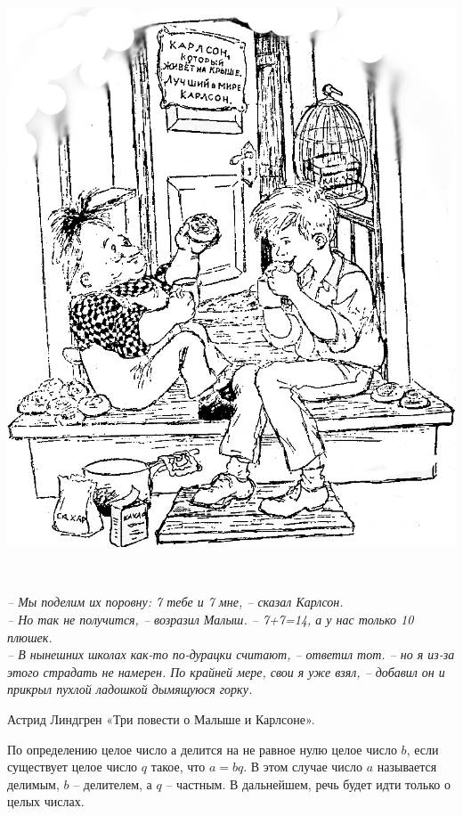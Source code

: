 
\begin{floatingfigure}[l]{0\textwidth}
	
	\includegraphics[scale=0.17]{./img/karlson}
\end{floatingfigure}~

\epigraph{
\textit{– Мы поделим их поровну: 7 тебе и 7 мне, – сказал Карлсон.\\
– Но так не получится, – возразил Малыш. –  7+7=14, а у нас только 10 плюшек.\\
– В нынешних школах как-то по-дурацки считают, – ответил тот. – но я из-за этого страдать не намерен. По крайней мере, свои я уже взял, – добавил он и прикрыл пухлой ладошкой дымящуюся горку.
}}{Астрид Линдгрен «Три повести о Малыше и Карлсоне».}


По определению целое число $а$ делится на не равное нулю целое число $b$, если существует целое число $q$ такое, что $a = bq$. В этом случае число $a$ называется делимым, $b$ – делителем, а $q$ – частным. В дальнейшем, речь будет идти только о целых числах.


